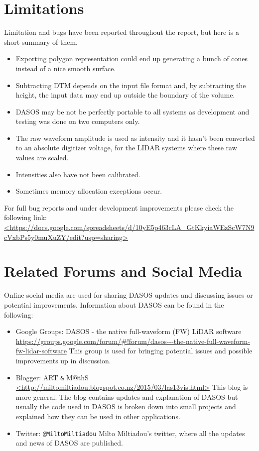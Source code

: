 \documentclass{article}
\begin{document}
	  	
		
	\section{Limitations}
	    Limitation and bugs have been reported throughout the report, but here is a short summary of them. 
	    \begin{itemize}
	    \item Exporting polygon representation could end up generating a bunch of cones instead of a nice smooth surface. 
	    \item Subtracting DTM depends on the input file format and, by subtracting the height, the input data may end up outside the boundary of the volume.
	    \item DASOS may be not be perfectly portable to all systems as development and testing was done on two computers only.	     
	    \item The raw waveform amplitude is used as intensity and it hasn't been converted to an absolute digitizer voltage, for the LIDAR systems where these raw values are scaled.
   	    \item Intensities also have not been calibrated.
	    \item Sometimes memory allocation exceptions occur.
  	    \end{itemize}
	    For full bug reports and under development improvements please check the following link:\newline
	    \url{<https://docs.google.com/spreadsheets/d/10yE5p463cLA_GtKkyiaWEzScW7N9cVxbPs5y0muXuZY/edit?usp=sharing>}
	    
	\newpage
	\section{Related Forums and Social Media}
	    Online social media are used for sharing DASOS updates and discussing issues or potential improvements. Information about DASOS can be found in the following:
	    \begin{itemize}
	    \item Google Groups: DASOS - the native full-waveform (FW) LiDAR software\newline
	    \url{https://groups.google.com/forum/#!forum/dasos---the-native-full-waveform-fw-lidar-software}\newline
	    This group is used for bringing potential issues and possible improvements up in discussion.
	    \item Blogger: ART \verb|&| M@thS\newline
	    \url{<http://miltomiltiadou.blogspot.co.nz/2015/03/las13vis.html>}\newline
	    This blog is more general. The blog contains updates and explanation of DASOS but usually the code used in DASOS is broken down into small projects and explained how they can be used in other applications.
	    \item Twitter: \verb|@MiltoMiltiadou|\newline
	    Milto Miltiadou's twitter, where all the updates and news of DASOS are published.  
	    \end{itemize}	
	    
	    	
	    	{}
	    	
\end{document}
